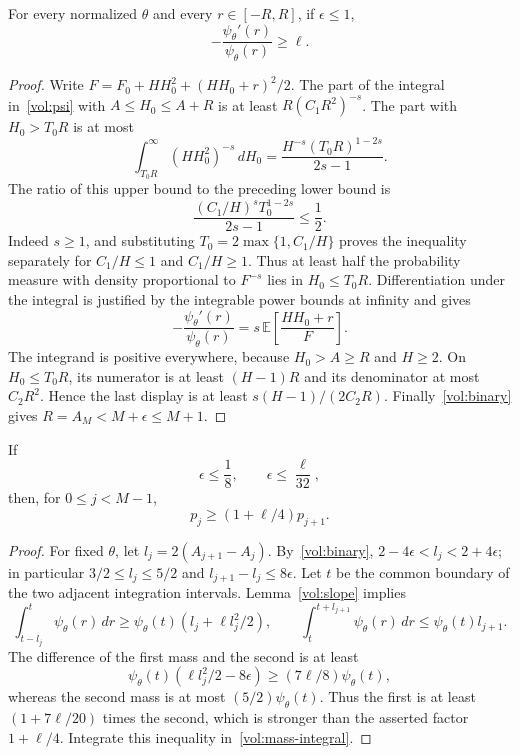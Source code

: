 \begin{lemma}
\label{vol:slope}
For every normalized $\theta$ and every $r\in[-R,R]$, if $\epsilon\le1$,
\[
 -\frac{\psi_\theta'(r)}{\psi_\theta(r)}\ge\ell.
\]
\end{lemma}
\begin{proof}
Write $F=F_0+HH_0^2+(HH_0+r)^2/2$.
The part of the integral in~\eqref{vol:psi} with
$A\le H_0\le A+R$ is at least $R(C_1R^2)^{-s}$.
The part with $H_0>T_0R$ is at most
\[
 \int_{T_0R}^\infty(HH_0^2)^{-s}\,dH_0
 =\frac{H^{-s}(T_0R)^{1-2s}}{2s-1}.
\]
The ratio of this upper bound to the preceding lower bound is
\[
 \frac{(C_1/H)^sT_0^{1-2s}}{2s-1}\le\frac12.
\]
Indeed $s\ge1$, and substituting $T_0=2\max\{1,C_1/H\}$ proves the inequality
separately for $C_1/H\le1$ and $C_1/H\ge1$.
Thus at least half the probability measure with density proportional to
$F^{-s}$ lies in $H_0\le T_0R$.
Differentiation under the integral is justified by the integrable power
bounds at infinity and gives
\[
 -\frac{\psi_\theta'(r)}{\psi_\theta(r)}
 =s\,\mathbb E\left[\frac{HH_0+r}{F}\right].
\]
The integrand is positive everywhere, because $H_0>A\ge R$ and $H\ge2$.
On $H_0\le T_0R$, its numerator is at least $(H-1)R$ and its denominator
at most $C_2R^2$. Hence the last display is at least
$s(H-1)/(2C_2R)$. Finally~\eqref{vol:binary} gives
$R=A_M<M+\epsilon\le M+1$.
\end{proof}

\begin{proposition}
\label{vol:ratio}
If
\[
 \epsilon\le\frac18,\qquad \epsilon\le\frac{\ell}{32},
\]
then, for $0\le j<M-1$,
\[
 p_j\ge(1+\ell/4)p_{j+1}.
\]
\end{proposition}
\begin{proof}
For fixed $\theta$, let $l_j=2(A_{j+1}-A_j)$.
By~\eqref{vol:binary}, $2-4\epsilon<l_j<2+4\epsilon$;
in particular $3/2\le l_j\le5/2$ and $l_{j+1}-l_j\le8\epsilon$.
Let $t$ be the common boundary of the two adjacent integration intervals.
Lemma~\ref{vol:slope} implies
\[
 \int_{t-l_j}^{t}\psi_\theta(r)\,dr
 \ge\psi_\theta(t)(l_j+\ell l_j^2/2),
 \qquad
 \int_t^{t+l_{j+1}}\psi_\theta(r)\,dr
 \le\psi_\theta(t)l_{j+1}.
\]
The difference of the first mass and the second is at least
\[
 \psi_\theta(t)(\ell l_j^2/2-8\epsilon)
 \ge(7\ell/8)\psi_\theta(t),
\]
whereas the second mass is at most $(5/2)\psi_\theta(t)$.
Thus the first is at least $(1+7\ell/20)$ times the second, which is stronger
than the asserted factor $1+\ell/4$. Integrate this inequality
in~\eqref{vol:mass-integral}.
\end{proof}

